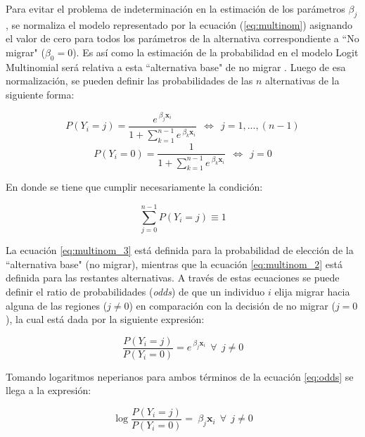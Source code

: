 \documentclass[12pt,a4paper]{article}
\begin{document}
Para evitar el problema de indeterminación en la estimación de los parámetros $\beta_{j}$, se normaliza el modelo representado por la ecuación (\ref{eq:multinom}) asignando el valor de cero para todos los parámetros de la alternativa correspondiente a ``No migrar" ($\beta_{0}=0$). Es así como la estimación de la probabilidad en el modelo Logit Multinomial será relativa a esta ``alternativa base"  de no migrar \parencite{coxhead_migration_2015}.
Luego de esa normalización, se pueden definir las probabilidades de las $n$ alternativas de la siguiente forma:
\begin {center}
\begin{equation}\label{eq:multinom_2}
P{(Y_{i}=j)}=\frac{e^{\ \beta_{j} \textbf{x}_{i}}}{1+\sum_{k=1}^{n-1}e^{\ \beta_{k} \textbf{x}_{i}}} \ \ \Leftrightarrow \ \ j=1,...,(n-1)
\end{equation}
\begin{equation}\label{eq:multinom_3}
P{(Y_{i}=0)}=\frac{1}{1+\sum_{k=1}^{n-1}e^{\ \beta_{k} \textbf{x}_{i}}} \ \ \Leftrightarrow \ \ j=0
\end{equation}
\end {center}

En donde se tiene que cumplir necesariamente la condición:
\begin {center}
\begin{equation}\label{eq:multinom_4}
\sum_{j=0}^{n-1}P{(Y_{i}=j)}\equiv1
\end{equation}
\end {center}

La ecuación \ref{eq:multinom_3} está definida para la probabilidad de elección de la ``alternativa base" (no migrar), mientras que la ecuación \ref{eq:multinom_2} está definida para las restantes alternativas. A través de estas ecuaciones se puede definir el ratio de probabilidades (\textit{odds}) de que un individuo $i$ elija migrar hacia alguna de las regiones ($j\neq0$) en comparación con la decisión de no migrar ($j=0$), la cual está dada por la siguiente expresión:
\begin{center}
\begin{equation}\label{eq:odds}
\frac{P{(Y_{i}=j)}}{P{(Y_{i}=0)}}=e^{\ \beta_{j} \textbf{x}_{i}} \ \ \forall \ \ j\neq0
\end{equation}
\end {center}
Tomando logaritmos neperianos para ambos términos de la ecuación \ref{eq:odds} se llega a la expresión:
\begin{center}
\begin{equation}\label{eq:logodds}
\log\frac{P{(Y_{i}=j)}}{P{(Y_{i}=0)}}=\ \beta_{j} \textbf{x}_{i} \ \ \forall \ \ j\neq0
\end{equation}
\end {center}
\end{document}
